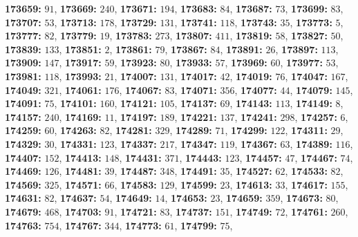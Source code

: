 \textsf{\bfseries 173659:} $91$, \textsf{\bfseries 173669:} $240$, \textsf{\bfseries 173671:} $194$, \textsf{\bfseries 173683:} $84$, \textsf{\bfseries 173687:} $73$, \textsf{\bfseries 173699:} $83$, \textsf{\bfseries 173707:} $53$, \textsf{\bfseries 173713:} $178$, \textsf{\bfseries 173729:} $131$, \textsf{\bfseries 173741:} $118$, \textsf{\bfseries 173743:} $35$, \textsf{\bfseries 173773:} $5$, \textsf{\bfseries 173777:} $82$, \textsf{\bfseries 173779:} $19$, \textsf{\bfseries 173783:} $273$, \textsf{\bfseries 173807:} $411$, \textsf{\bfseries 173819:} $58$, \textsf{\bfseries 173827:} $50$, \textsf{\bfseries 173839:} $133$, \textsf{\bfseries 173851:} $2$, \textsf{\bfseries 173861:} $79$, \textsf{\bfseries 173867:} $84$, \textsf{\bfseries 173891:} $26$, \textsf{\bfseries 173897:} $113$, \textsf{\bfseries 173909:} $147$, \textsf{\bfseries 173917:} $59$, \textsf{\bfseries 173923:} $80$, \textsf{\bfseries 173933:} $57$, \textsf{\bfseries 173969:} $60$, \textsf{\bfseries 173977:} $53$, \textsf{\bfseries 173981:} $118$, \textsf{\bfseries 173993:} $21$, \textsf{\bfseries 174007:} $131$, \textsf{\bfseries 174017:} $42$, \textsf{\bfseries 174019:} $76$, \textsf{\bfseries 174047:} $167$, \textsf{\bfseries 174049:} $321$, \textsf{\bfseries 174061:} $176$, \textsf{\bfseries 174067:} $83$, \textsf{\bfseries 174071:} $356$, \textsf{\bfseries 174077:} $44$, \textsf{\bfseries 174079:} $145$, \textsf{\bfseries 174091:} $75$, \textsf{\bfseries 174101:} $160$, \textsf{\bfseries 174121:} $105$, \textsf{\bfseries 174137:} $69$, \textsf{\bfseries 174143:} $113$, \textsf{\bfseries 174149:} $8$, \textsf{\bfseries 174157:} $240$, \textsf{\bfseries 174169:} $11$, \textsf{\bfseries 174197:} $189$, \textsf{\bfseries 174221:} $137$, \textsf{\bfseries 174241:} $298$, \textsf{\bfseries 174257:} $6$, \textsf{\bfseries 174259:} $60$, \textsf{\bfseries 174263:} $82$, \textsf{\bfseries 174281:} $329$, \textsf{\bfseries 174289:} $71$, \textsf{\bfseries 174299:} $122$, \textsf{\bfseries 174311:} $29$, \textsf{\bfseries 174329:} $30$, \textsf{\bfseries 174331:} $123$, \textsf{\bfseries 174337:} $217$, \textsf{\bfseries 174347:} $119$, \textsf{\bfseries 174367:} $63$, \textsf{\bfseries 174389:} $116$, \textsf{\bfseries 174407:} $152$, \textsf{\bfseries 174413:} $148$, \textsf{\bfseries 174431:} $371$, \textsf{\bfseries 174443:} $123$, \textsf{\bfseries 174457:} $47$, \textsf{\bfseries 174467:} $74$, \textsf{\bfseries 174469:} $126$, \textsf{\bfseries 174481:} $39$, \textsf{\bfseries 174487:} $348$, \textsf{\bfseries 174491:} $35$, \textsf{\bfseries 174527:} $62$, \textsf{\bfseries 174533:} $82$, \textsf{\bfseries 174569:} $325$, \textsf{\bfseries 174571:} $66$, \textsf{\bfseries 174583:} $129$, \textsf{\bfseries 174599:} $23$, \textsf{\bfseries 174613:} $33$, \textsf{\bfseries 174617:} $155$, \textsf{\bfseries 174631:} $82$, \textsf{\bfseries 174637:} $54$, \textsf{\bfseries 174649:} $14$, \textsf{\bfseries 174653:} $23$, \textsf{\bfseries 174659:} $359$, \textsf{\bfseries 174673:} $80$, \textsf{\bfseries 174679:} $468$, \textsf{\bfseries 174703:} $91$, \textsf{\bfseries 174721:} $83$, \textsf{\bfseries 174737:} $151$, \textsf{\bfseries 174749:} $72$, \textsf{\bfseries 174761:} $260$, \textsf{\bfseries 174763:} $754$, \textsf{\bfseries 174767:} $344$, \textsf{\bfseries 174773:} $61$, \textsf{\bfseries 174799:} $75$, 
